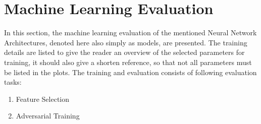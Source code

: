 \section{Machine Learning Evaluation}\label{sec:ml}
In this section, the machine learning evaluation of the mentioned Neural Network Architectures, denoted here also simply as models, are presented.
The training details are listed to give the reader an overview of the selected parameters for training, it should also give a shorten reference, so that not all parameters must be listed in the plots. 
The training and evaluation consists of following evaluation tasks:
\begin{enumerate}
  \item Feature Selection
  \item Adversarial Training
\end{enumerate}
